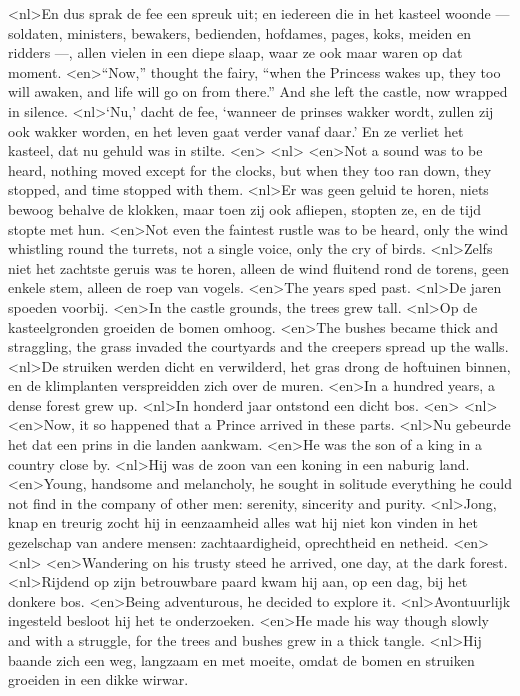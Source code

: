 <nl>En dus sprak de fee een spreuk uit; en iedereen die in het kasteel woonde --- soldaten, ministers, bewakers, bedienden, hofdames, pages, koks, meiden en ridders ---, allen vielen in een diepe slaap, waar ze ook maar waren op dat moment. 
<en>“Now,” thought the fairy, “when the Princess wakes up, they too will awaken, and life will go on from there.” And she left the castle, now wrapped in silence.
<nl>`Nu,' dacht de fee, `wanneer de prinses wakker wordt, zullen zij ook wakker worden, en het leven gaat verder vanaf daar.' En ze verliet het kasteel, dat nu gehuld was in stilte.
<en>
<nl>
<en>Not a sound was to be heard, nothing moved except for the clocks, but when they too ran down, they stopped, and time stopped with them.
<nl>Er was geen geluid te horen, niets bewoog behalve de klokken, maar toen zij ook afliepen, stopten ze, en de tijd stopte met hun.
<en>Not even the faintest rustle was to be heard, only the wind whistling round the turrets, not a single voice, only the cry of birds.
<nl>Zelfs niet het zachtste geruis was te horen, alleen de wind fluitend rond de torens, geen enkele stem, alleen de roep van vogels.
<en>The years sped past.
<nl>De jaren spoeden voorbij.
<en>In the castle grounds, the trees grew tall.
<nl>Op de kasteelgronden groeiden de bomen omhoog. 
<en>The bushes became thick and straggling, the grass invaded the courtyards and the creepers spread up the walls.
<nl>De struiken werden dicht en verwilderd, het gras drong de hoftuinen binnen, en de klimplanten verspreidden zich over de muren.
<en>In a hundred years, a dense forest grew up.
<nl>In honderd jaar ontstond een dicht bos.
<en>
<nl>
<en>Now, it so happened that a Prince arrived in these parts.
<nl>Nu gebeurde het dat een prins in die landen aankwam.
<en>He was the son of a king in a country close by.
<nl>Hij was de zoon van een koning in een naburig land.
<en>Young, handsome and melancholy, he sought in solitude everything he could not find in the company of other men: serenity, sincerity and purity.
<nl>Jong, knap en treurig zocht hij in eenzaamheid alles wat hij niet kon vinden in het gezelschap van andere mensen: zachtaardigheid, oprechtheid en netheid. 
<en>
<nl>
<en>Wandering on his trusty steed he arrived, one day, at the dark forest.
<nl>Rijdend op zijn betrouwbare paard kwam hij aan, op een dag, bij het donkere bos.
<en>Being adventurous, he decided to explore it.
<nl>Avontuurlijk ingesteld besloot hij het te onderzoeken.
<en>He made his way though slowly and with a struggle, for the trees and bushes grew in a thick tangle.
<nl>Hij baande zich een weg, langzaam en met moeite, omdat de bomen en struiken groeiden in een dikke wirwar. 
